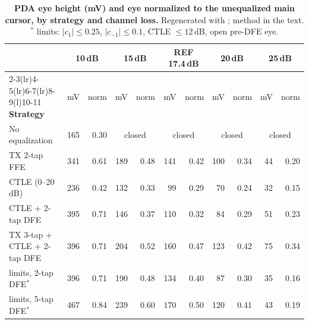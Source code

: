 \begin{table}[!tbp]
\centering\footnotesize
\caption{\textbf{PDA eye height (mV) and eye normalized to the unequalized main cursor, by strategy and channel loss.} Regenerated with ; method in the text. $^\ast$\OS{} limits: $\lvert c_1\rvert\le0.25$, $\lvert c_{-1}\rvert\le0.1$, CTLE $\le12$\,dB, open pre-DFE eye.}
\label{tab:eq-partition}
\setlength{\tabcolsep}{4.2pt}
\begin{tabular}{@{}l rr rr rr rr rr@{}}
\toprule
 & \multicolumn{2}{c}{\textbf{10\,dB}} & \multicolumn{2}{c}{\textbf{15\,dB}} & \multicolumn{2}{c}{\textbf{REF 17.4\,dB}} & \multicolumn{2}{c}{\textbf{20\,dB}} & \multicolumn{2}{c}{\textbf{25\,dB}}\\
\cmidrule(lr){2-3}\cmidrule(lr){4-5}\cmidrule(lr){6-7}\cmidrule(lr){8-9}\cmidrule(l){10-11}
\textbf{Strategy} & mV & norm & mV & norm & mV & norm & mV & norm & mV & norm\\
\midrule
No equalization            & 165 & 0.30 & \multicolumn{2}{c}{\textcolor{c4}{closed}} & \multicolumn{2}{c}{\textcolor{c4}{closed}} & \multicolumn{2}{c}{\textcolor{c4}{closed}} & \multicolumn{2}{c}{\textcolor{c4}{closed}}\\
TX 2-tap FFE               & 341 & 0.61 & 189 & 0.48 & 141 & 0.42 & 100 & 0.34 & 44 & 0.20\\
CTLE (0--20\,dB)           & 236 & 0.42 & 132 & 0.33 & 99 & 0.29 & 70 & 0.24 & 32 & 0.15\\
CTLE + 2-tap DFE           & 395 & 0.71 & 146 & 0.37 & 110 & 0.32 & 84 & 0.29 & 51 & 0.23\\
TX 3-tap + CTLE + 2-tap DFE & 396 & 0.71 & 204 & 0.52 & 160 & 0.47 & 123 & 0.42 & 75 & 0.34\\
\midrule
\OS{} limits, 2-tap DFE$^\ast$ & 396 & 0.71 & 190 & 0.48 & 134 & 0.40 & 87 & 0.30 & 35 & 0.16\\
\OS{} limits, 5-tap DFE$^\ast$ & 467 & 0.84 & 239 & 0.60 & 170 & 0.50 & 120 & 0.41 & 43 & 0.19\\
\bottomrule
\end{tabular}
\end{table}


